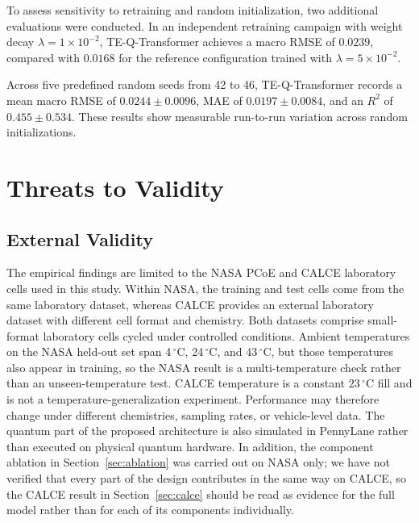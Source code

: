 \documentclass[a4paper,fleqn]{cas-sc}
\begin{document}
To assess sensitivity to retraining and random initialization, two additional evaluations were conducted. In an independent retraining campaign with weight decay $\lambda = 1\times10^{-2}$, TE-Q-Transformer achieves a macro RMSE of $0.0239$, compared with $0.0168$ for the reference configuration trained with $\lambda = 5\times10^{-2}$.

Across five predefined random seeds from 42 to 46, TE-Q-Transformer records a mean macro RMSE of $0.0244 \pm 0.0096$, MAE of $0.0197 \pm 0.0084$, and an $R^2$ of $0.455 \pm 0.534$. These results show measurable run-to-run variation across random initializations.

\section{Threats to Validity}\label{sec:threats}

\subsection{External Validity}\label{sec:external}
The empirical findings are limited to the NASA PCoE and CALCE laboratory cells used in this study. Within NASA, the training and test cells come from the same laboratory dataset, whereas CALCE provides an external laboratory dataset with different cell format and chemistry. Both datasets comprise small-format laboratory cells cycled under controlled conditions.
Ambient temperatures on the NASA held-out set span 4\,$^\circ$C, 24\,$^\circ$C, and 43\,$^\circ$C, but those temperatures also appear in training, so the NASA result is a multi-temperature check rather than an unseen-temperature test. CALCE temperature is a constant $23\,^\circ$C fill and is not a temperature-generalization experiment. Performance may therefore change under different chemistries, sampling rates, or vehicle-level data. 
The quantum part of the proposed architecture is also simulated in PennyLane rather than executed on physical quantum hardware.
In addition, the component ablation in Section~\ref{sec:ablation} was carried out on NASA only; we have not verified that every part of the design contributes in the same way on CALCE, so the CALCE result in Section~\ref{sec:calce} should be read as evidence for the full model rather than for each of its components individually.
\end{document}
